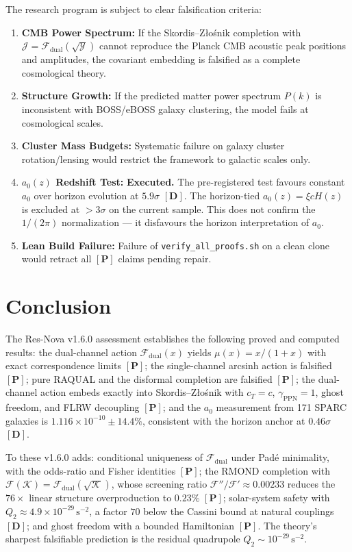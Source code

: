 \documentclass[aps,prd,preprint,superscriptaddress,nofootinbib,amsmath,amssymb,floatfix]{revtex4-2}
\begin{document}
The research program is subject to clear falsification criteria:
\begin{enumerate}
    \item \textbf{CMB Power Spectrum:} If the Skordis--Z\l{}o\'snik completion with $\mathcal{J} = \mathcal{F}_{\text{dual}}(\sqrt{\mathcal{Y}})$ cannot reproduce the Planck CMB acoustic peak positions and amplitudes, the covariant embedding is falsified as a complete cosmological theory.
    \item \textbf{Structure Growth:} If the predicted matter power spectrum $P(k)$ is inconsistent with BOSS/eBOSS galaxy clustering, the model fails at cosmological scales.
    \item \textbf{Cluster Mass Budgets:} Systematic failure on galaxy cluster rotation/lensing would restrict the framework to galactic scales only.
    \item \textbf{$a_0(z)$ Redshift Test:} \textbf{Executed.} The pre-registered test favours constant $a_0$ over horizon evolution at $5.9\sigma$ $\mathbf{[D]}$. The horizon-tied $a_0(z) = \xi c H(z)$ is excluded at $> 3\sigma$ on the current sample. This does not confirm the $1/(2\pi)$ normalization --- it disfavours the horizon interpretation of $a_0$.
    \item \textbf{Lean Build Failure:} Failure of \texttt{verify\_all\_proofs.sh} on a clean clone would retract all $\mathbf{[P]}$ claims pending repair.
\end{enumerate}

\section{Conclusion}
\label{sec:conclusion}

The Res-Nova v1.6.0 assessment establishes the following proved and computed results: the dual-channel action $\mathcal{F}_{\text{dual}}(x)$ yields $\mu(x) = x/(1+x)$ with exact correspondence limits $\mathbf{[P]}$; the single-channel arcsinh action is falsified $\mathbf{[P]}$; pure RAQUAL and the disformal completion are falsified $\mathbf{[P]}$; the dual-channel action embeds exactly into Skordis--Z\l{}o\'snik with $c_T = c$, $\gamma_{\text{PPN}} = 1$, ghost freedom, and FLRW decoupling $\mathbf{[P]}$; and the $a_0$ measurement from 171 SPARC galaxies is $1.116 \times 10^{-10} \pm 14.4\%$, consistent with the horizon anchor at $0.46\sigma$ $\mathbf{[D]}$.

To these v1.6.0 adds: conditional uniqueness of $\mathcal{F}_{\text{dual}}$ under Pad\'e minimality, with the odds-ratio and Fisher identities $\mathbf{[P]}$; the RMOND completion with $\mathcal{F}(\mathcal{K}) = \mathcal{F}_{\text{dual}}(\sqrt{\mathcal{K}})$, whose screening ratio $\mathcal{F}''/\mathcal{F}' \approx 0.00233$ reduces the $76\times$ linear structure overproduction to $0.23\%$ $\mathbf{[P]}$; solar-system safety with $Q_2 \approx 4.9\times10^{-29}\,\text{s}^{-2}$, a factor $70$ below the Cassini bound at natural couplings $\mathbf{[D]}$; and ghost freedom with a bounded Hamiltonian $\mathbf{[P]}$. The theory's sharpest falsifiable prediction is the residual quadrupole $Q_2 \sim 10^{-29}\,\text{s}^{-2}$.
\end{document}
